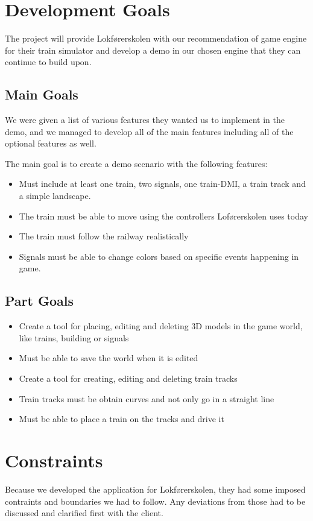 \section{Development Goals}
The project will provide Lokførerskolen with our recommendation of game engine for their train simulator and develop a demo in our chosen engine that they can continue to build upon. 



\subsection{Main Goals}
We were given a list of various features they wanted us to implement in the demo, and we managed to develop all of the main features including all of the optional features as well.

The main goal is to create a demo scenario with the following features:
\begin{itemize}
    \item Must include at least one train, two signals, one train-DMI, a train track and a simple landscape.
    \item The train must be able to move using the controllers Loførerskolen uses today
    \item The train must follow the railway realistically
    \item Signals must be able to change colors based on specific events happening in game.
\end{itemize}

\subsection{Part Goals}
\begin{itemize}
    \item Create a tool for placing, editing and deleting 3D models in the game world, like trains, building or signals
    \item Must be able to save the world when it is edited
    \item Create a tool for creating, editing and deleting train tracks
    \item Train tracks must be obtain curves and not only go in a straight line
    \item Must be able to place a train on the tracks and drive it 
\end{itemize}



\section{Constraints}
Because we developed the application for Lokførerskolen, they had some imposed contraints and boundaries we had to follow. Any deviations from those had to be discussed and clarified first with the client.

